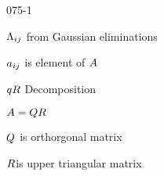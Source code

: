 \begin{mitframe}{075-1}
\begin{listone}
\begin{listtwo}
\begin{listthree}
                		\item $\debroglie_{\state{j}}$ from Gaussian eliminations
                        \item $\activity_{\state{j}}$ is element of $\helmholtz$
                \end{listthree}
	        \end{listtwo}
	\item $\heatflux\gasconst$ Decomposition
    	\begin{listtwo}
        	\item $\helmholtz=\heatflow\gasconst$
            \item $\heatflow$ is orthorgonal matrix
            \item $\gasconst$is upper triangular matrix
        \end{listtwo}
\end{listone}    
\end{mitframe}